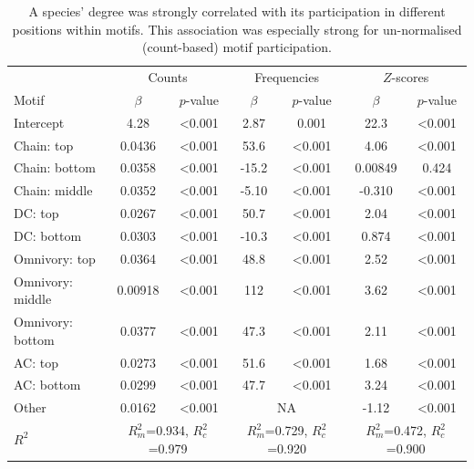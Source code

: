 \documentclass[12pt]{article}
\begin{document}
\begin{spacing}{2.0}
			\begin{table}[hb!]
    			\caption{A species' degree was strongly correlated with its participation in different positions within motifs. This association was especially strong for un-normalised (count-based) motif participation.}
    			\label{tab:positions_vs_deg}
    			\begin{tabular}{l | c c | c c | c c}
    			& \multicolumn{2}{c|}{Counts} & \multicolumn{2}{c}{Frequencies} & \multicolumn{2}{|c}{$Z$-scores} \\
    			Motif & $\beta$ & $p$-value & $\beta$ & $p$-value & $\beta$ & $p$-value \\
    			\hline
                Intercept	&	4.28	&	\textless0.001	&	2.87	&	0.001	&	22.3	&	\textless0.001	\\
                Chain: top	&	0.0436	&	\textless0.001	&	53.6	&	\textless0.001	&	4.06	&	\textless0.001	\\
                Chain: bottom	&	0.0358	&	\textless0.001	&	-15.2	&	\textless0.001	&	0.00849	&	0.424	\\
                Chain: middle	&	0.0352	&	\textless0.001	&	-5.10	&	\textless0.001	&	-0.310	&	\textless0.001	\\
                DC: top	&	0.0267	&	\textless0.001	&	50.7	&	\textless0.001	&	2.04	&	\textless0.001	\\
                DC: bottom	&	0.0303	&	\textless0.001	&	-10.3	&	\textless0.001	&	0.874	&	\textless0.001	\\
                Omnivory: top	&	0.0364	&	\textless0.001	&	48.8	&	\textless0.001	&	2.52	&	\textless0.001	\\
                Omnivory: middle	&	0.00918 	&	\textless0.001	&	112	&	\textless0.001	&	3.62	&	\textless0.001	\\
                Omnivory: bottom	&	0.0377	&	\textless0.001	&	47.3	&	\textless0.001	&	2.11	&	\textless0.001	\\
                AC: top	&	0.0273	&	\textless0.001	&	51.6	&	\textless0.001	&	1.68	&	\textless0.001	\\
                AC: bottom	&	0.0299	&	\textless0.001	&	47.7	&	\textless0.001	&	3.24	&	\textless0.001	\\
                Other	&	0.0162	&	\textless0.001	& \multicolumn{2}{c|}{NA} &	-1.12	&	\textless0.001	\\
    			\hline
    			$R^2$ & \multicolumn{2}{c|}{\tiny{$R^2_m$=0.934, $R^2_c$=0.979}} & \multicolumn{2}{c}{\tiny{$R^2_m$=0.729, $R^2_c$=0.920}} & \multicolumn{2}{|c}{\tiny{$R^2_m$=0.472, $R^2_c$=0.900}} \\
    			\hline
                \end{tabular}
                \end{table}



\end{spacing}
\end{document}

